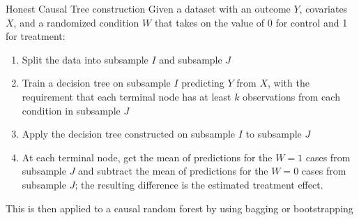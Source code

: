 \documentclass[9pt]{beamer}
\begin{document}
\begin{frame}{Honest Causal Tree construction}
Given a dataset with an outcome $Y$, covariates $X$, and a randomized condition $W$ that takes on the value of 0 for control and 1 for treatment:

\begin{enumerate}
\item Split the data into subsample $I$ and subsample $J$

\item Train a decision tree on subsample $I$ predicting $Y$ from $X$, with the requirement that each terminal node has at least $k$ observations from each condition in subsample $J$

\item Apply the decision tree constructed on subsample $I$ to subsample $J$

\item At each terminal node, get the mean of predictions for the $W = 1$ cases from subsample $J$ and subtract the mean of predictions for the $W = 0$ cases from subsample $J$; the resulting difference is the estimated treatment effect.

\end{enumerate}

This is then applied to a causal random forest by using bagging or bootstrapping

\end{frame}
\end{document}
